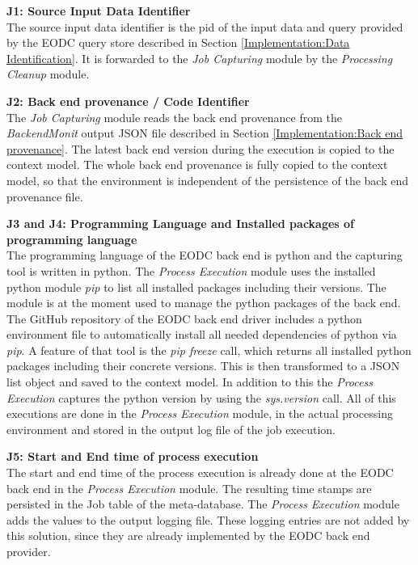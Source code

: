 \documentclass[draft,final]{vutinfth} %
\begin{document}
\textbf{J1:  Source Input Data Identifier} \\
The source input data identifier is the pid of the input data and query provided by the EODC query store described in Section \ref{Implementation:Data Identification}. It is forwarded to the \textit{Job Capturing} module by the \textit{Processing Cleanup} module. 

\textbf{J2: Back end provenance / Code Identifier} \\
The \textit{Job Capturing} module reads the back end provenance from the \textit{BackendMonit} output JSON file described in Section \ref{Implementation:Back end provenance}. The latest back end version during the execution is copied to the context model. The whole back end provenance is fully copied to the context model, so that the environment is independent of the persistence of the back end provenance file. 

\textbf{J3 and J4: Programming Language and  Installed packages of programming language} \\
The programming language of the EODC back end is python and the capturing tool is written in python. The \textit{Process Execution} module uses the installed python module \textit{pip} to list all installed packages including their versions. The module is at the moment used to manage the python packages of the back end. The GitHub repository of the EODC back end driver includes a python environment file to automatically install all needed dependencies of python via \textit{pip}. A feature of that tool is the \textit{pip freeze} call, which returns all installed python packages including their concrete versions. This is then transformed to a JSON list object and saved to the context model. In addition to this the \textit{Process Execution} captures the python version by using the \textit{sys.version} call. All of this executions are done in the \textit{Process Execution} module, in the actual processing environment and stored in the output log file of the job execution.    

\textbf{J5: Start and End time of process execution} \\
The start and end time of the process execution is already done at the EODC back end in the  \textit{Process Execution} module. The resulting time stamps are persisted in the Job table of the meta-database. The \textit{Process Execution} module adds the values to the output logging file. These logging entries are not added by this solution, since they are already implemented by the EODC back end provider.  
\end{document}
